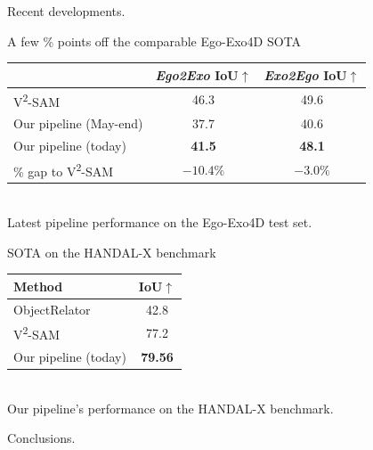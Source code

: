 \documentclass[professionalfonts,aspectratio=169]{beamer}
\begin{document}
\begin{frame}
\begin{center}
    {\Large Recent developments.}
\end{center}
\end{frame}

\begin{frame}[t]
\begin{center}
{\large A few \% points off the comparable Ego-Exo4D SOTA}
\end{center}
\vfill
\centering
\small
\begin{tabular}{lcc}
  \toprule
  & \textit{Ego2Exo} IoU$\uparrow$ & \textit{Exo2Ego} IoU$\uparrow$ \\
  \midrule
  V\textsuperscript{2}-SAM & 46.3 & 49.6 \\
  Our pipeline (May-end)   & 37.7 & 40.6 \\
  \midrule
  Our pipeline (today) & \textbf{41.5} & \textbf{48.1} \\
  \% gap to V\textsuperscript{2}-SAM & $-10.4\%$ & $-3.0\%$ \\
  \bottomrule
\end{tabular}
\\[0.8em]
{\normalsize Latest pipeline performance on the Ego-Exo4D test set.}
\vfill
\end{frame}

\begin{frame}[t]
\begin{center}
{\large SOTA on the HANDAL-X benchmark}
\end{center}
\vfill
\centering
\footnotesize
\setlength{\tabcolsep}{4pt}
\begin{tabular}{lc}
  \toprule
  Method & IoU$\uparrow$ \\
  \midrule
  ObjectRelator & 42.8 \\
  V\textsuperscript{2}-SAM & 77.2 \\
  \midrule
  Our pipeline (today) & \textbf{79.56} \\
  \bottomrule
\end{tabular}
\\[0.8em]
{\normalsize Our pipeline's performance on the HANDAL-X benchmark.}
\vfill
\end{frame}

\begin{frame}
\begin{center}
    {\Large Conclusions.}
\end{center}
\end{frame}
\end{document}

